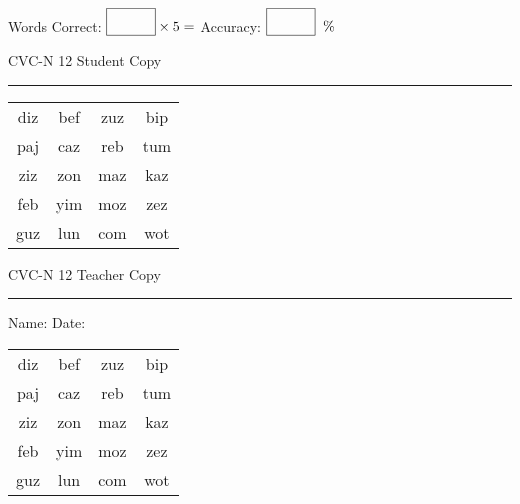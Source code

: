 \documentclass{memoir}
\begin{document}
\small

Words Correct: $\fbox{\phantom{\huge 100}} \times 5 = $ Accuracy: $\fbox{\phantom{\huge 100}}\;\; \%$ 

\vfill

\newpage


\footnotesize \noindent
CVC-N 12 \hfill Student Copy
\smallskip
\hrule

\Large

\setlength{\tabcolsep}{14pt}
\def\arraystretch{2}

{\selectfont


\begin{vplace}[0.5]
\begin{center}
\begin{tabular}{cccc}
diz & bef & zuz & bip \\
paj & caz & reb & tum \\
ziz & zon & maz & kaz \\
feb & yim & moz & zez \\
guz & lun & com & wot \\
\end{tabular}
\end{center}
\end{vplace}

}

\newpage

\footnotesize \noindent
CVC-N 12 \hfill Teacher Copy
\smallskip
\hrule

\small

\vfill

\noindent
Name: \underline{\hspace{1.75in}} \hfill Date: \underline{\hspace{1in}}

\Large

{\selectfont


\begin{vplace}[0.5]
\begin{center}
\begin{tabular}{cccc}
diz & bef & zuz & bip \\
paj & caz & reb & tum \\
ziz & zon & maz & kaz \\
feb & yim & moz & zez \\
guz & lun & com & wot \\
\end{tabular}
\end{center}
\end{vplace}



}
\end{document}
